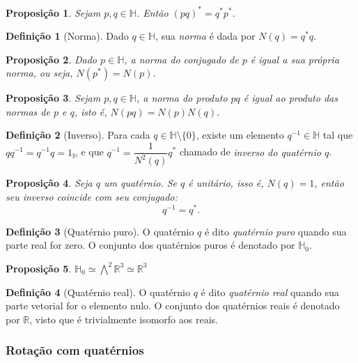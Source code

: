 \documentclass[a4paper,12pt]{report}
\theoremstyle{plain}
\newtheorem{proposicao}{Proposição}[section]
\theoremstyle{definition}
\newtheorem{definicao}{Definição}[section]
\begin{document}
	\begin{proposicao}
		Sejam $p,q\in \mathbb{H}$. Então $(pq)^* = q^*p^*$.
	\end{proposicao}
	
	\begin{definicao}[Norma]
		Dado $q \in \mathbb{H}$, sua \textit{norma} é dada por $N(q) = q^*q$. 	
	\end{definicao}
	
	\begin{proposicao}
		Dado $p \in \mathbb{H}$, a norma do conjugado de $p$ é igual a sua própria norma, ou seja, $N(p^*) = N(p)$.
	\end{proposicao}
	
	\begin{proposicao}
		Sejam $p, q \in \mathbb{H}$, a norma do produto $pq$ é igual ao produto das normas de $p$ e $q$, isto é, $N(pq) = N(p)N(q)$.
	\end{proposicao}
	
	\begin{definicao}[Inverso]
		Para cada $q\in \mathbb{H}\setminus\{0\}$, existe um elemento $q^{-1}\in \mathbb{H}$ tal que $qq^{-1} = q^{-1}q = 1_\mathbb{H}$ e que $q^{-1} = \dfrac{1}{N^2(q)}q^*$ chamado de \emph{inverso do quatérnio $q$}.
	\end{definicao}
	
	\begin{proposicao}
		Seja $q$ um quatérnio. Se $q$ é unitário, isso é, $N(q) = 1$, então seu inverso coincide com seu conjugado: $$q^{-1} = q^*.$$
	\end{proposicao}
	
	\begin{definicao}[Quatérnio puro]
		O quatérnio $q$ é dito \emph{quatérnio puro} quando sua parte real for zero. O conjunto dos quatérnios puros é denotado por $\mathbb{H}_0$.
	\end{definicao}

	\begin{proposicao}
		$\mathbb{H}_0 \simeq \bigwedge^2\mathbb{R}^3 \simeq \mathbb{R}^3$
	\end{proposicao}

	\begin{definicao}[Quatérnio real]
		O quatérnio $q$ é dito \emph{quatérnio real} quando sua parte vetorial for o elemento nulo. O conjunto dos quatérnios reais é denotado por $\mathbb{R}$, visto que é trivialmente isomorfo aos reais.
	\end{definicao}	
	
	\subsubsection{Rotação com quatérnios}
	
\end{document}
